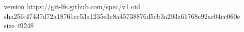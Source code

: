 version https://git-lfs.github.com/spec/v1
oid sha256:47437d72a18761cc53a1235e3e8a45738876d5cb3a203a61768e92ac04cc060e
size 49248

